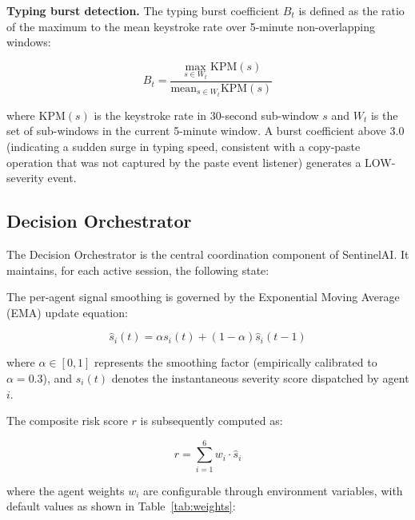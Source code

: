 \textbf{Typing burst detection.} The typing burst coefficient $B_t$ is defined as the ratio of the maximum to the mean keystroke rate over 5-minute non-overlapping windows:

\begin{equation}
    B_t = \frac{\max_{s \in W_t} \text{KPM}(s)}{\text{mean}_{s \in W_t} \text{KPM}(s)}
    \label{eq:burst}
\end{equation}

where $\text{KPM}(s)$ is the keystroke rate in 30-second sub-window $s$ and $W_t$ is the set of sub-windows in the current 5-minute window. A burst coefficient above 3.0 (indicating a sudden surge in typing speed, consistent with a copy-paste operation that was not captured by the paste event listener) generates a LOW-severity event.

\subsection{Decision Orchestrator}

The Decision Orchestrator is the central coordination component of SentinelAI. It maintains, for each active session, the following state:

The per-agent signal smoothing is governed by the Exponential Moving Average (EMA) update equation:

\begin{equation}
    \hat{s}_i(t) = \alpha s_i(t) + (1 - \alpha)\hat{s}_i(t - 1)
    \label{eq:ema}
\end{equation}

where $\alpha \in [0, 1]$ represents the smoothing factor (empirically calibrated to $\alpha = 0.3$), and $s_i(t)$ denotes the instantaneous severity score dispatched by agent $i$.

The composite risk score $r$ is subsequently computed as:

\begin{equation}
    r = \sum_{i=1}^{6} w_i \cdot \hat{s}_i
    \label{eq:risk}
\end{equation}

where the agent weights $w_i$ are configurable through environment variables, with default values as shown in Table~\ref{tab:weights}:

